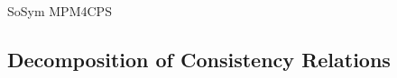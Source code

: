 \begin{copiedFrom}{SoSym MPM4CPS}



\subsection{Decomposition of Consistency Relations}


\end{copiedFrom}

